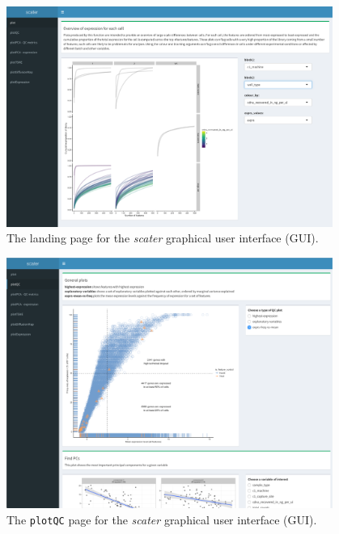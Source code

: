 \documentclass{revtex4}
\begin{document}
\begin{figure}[!tpb]
\centerline{\includegraphics[width=0.95\textwidth]{figures/scater_gui_landing_page.pdf}}
\caption{The landing page for the \emph{scater} graphical user interface (GUI).}\label{fig:scater-gui-landing}
\end{figure}


\begin{figure}[!tpb]
\centerline{\includegraphics[width=0.95\textwidth]{figures/scater_gui_plotqc.pdf}}
\caption{The \texttt{plotQC} page for the \emph{scater} graphical user interface (GUI).}\label{fig:scater-plotqc}
\end{figure}
\end{document}
